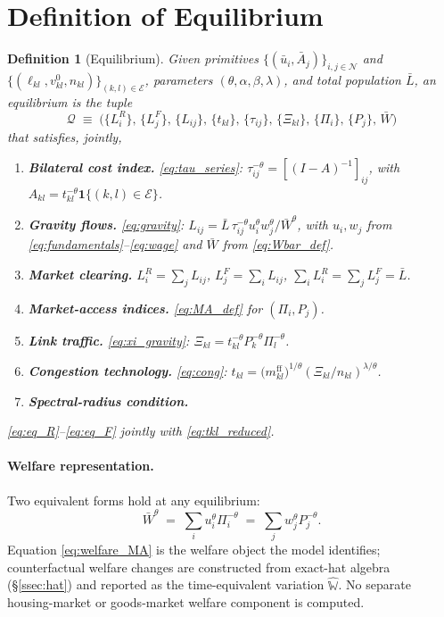 \documentclass[12pt]{article}
\newtheorem{definition}{Definition}
\newcommand{\N}{\mathcal N}
\newcommand{\E}{\mathcal E}
\newcommand{\Lbar}{\bar L}
\newcommand{\Wbar}{\bar W}
\newcommand{\ubar}{\bar u}
\newcommand{\Abar}{\bar A}
\newcommand{\tbar}{m^{\mathrm{ff}}}
\newcommand{\tkl}{t_{kl}}
\newcommand{\tijk}{\tau_{ij}}
\begin{document}
\section{Definition of Equilibrium}\label{sec:eq}

\begin{definition}[Equilibrium]\label{def:eq}
Given primitives $\{(\ubar_i,\Abar_j)\}_{i,j\in\N}$ and
$\{(\ell_{kl},v^{0}_{kl},n_{kl})\}_{(k,l)\in\E}$, parameters
$(\theta,\alpha,\beta,\lambda)$, and total population $\Lbar$, an
equilibrium is the tuple
\[
  \mathcal Q
  \;\equiv\;
  \bigl(
    \{L_i^R\},\,\{L_j^F\},\,\{L_{ij}\},\,
    \{\tkl\},\,\{\tijk\},\,\{\Xi_{kl}\},\,
    \{\Pi_i\},\,\{P_j\},\,\Wbar
  \bigr)
\]
that satisfies, jointly,
\begin{enumerate}[label=(\textbf{E\arabic*}),leftmargin=3em,itemsep=0.25em]
\item \textbf{Bilateral cost index.} \eqref{eq:tau_series}:
  $\tijk^{-\theta}=[(I-A)^{-1}]_{ij}$, with
  $A_{kl}=\tkl^{-\theta}\mathbf 1\{(k,l)\in\E\}$.
\item \textbf{Gravity flows.} \eqref{eq:gravity}:
  $L_{ij}=\Lbar\,\tijk^{-\theta}u_i^{\theta}w_j^{\theta}/\Wbar^{\theta}$,
  with $u_i,w_j$ from \eqref{eq:fundamentals}--\eqref{eq:wage} and
  $\Wbar$ from \eqref{eq:Wbar_def}.
\item \textbf{Market clearing.} $L_i^R=\sum_j L_{ij}$,
  $L_j^F=\sum_i L_{ij}$, $\sum_i L_i^R=\sum_j L_j^F=\Lbar$.
\item \textbf{Market-access indices.} \eqref{eq:MA_def} for
  $(\Pi_i,P_j)$.
\item \textbf{Link traffic.} \eqref{eq:xi_gravity}:
  $\Xi_{kl}=\tkl^{-\theta}P_k^{-\theta}\Pi_l^{-\theta}$.
\item \textbf{Congestion technology.} \eqref{eq:cong}:
  $\tkl=\bigl(\tbar_{kl}\bigr)^{1/\theta}(\Xi_{kl}/n_{kl})^{\lambda/\theta}$.
\item \textbf{Spectral-radius condition.} 
\end{enumerate}
\eqref{eq:eq_R}--\eqref{eq:eq_F} jointly with
\eqref{eq:tkl_reduced}.
\end{definition}


\paragraph{Welfare representation.}
Two equivalent forms hold at any equilibrium:
\begin{equation}
  \Wbar^{\theta}
  \;=\;\sum_i u_i^{\theta}\Pi_i^{-\theta}
  \;=\;\sum_j w_j^{\theta}P_j^{-\theta}.
  \label{eq:welfare_MA}
\end{equation}
Equation \eqref{eq:welfare_MA} is the welfare object the model
identifies; counterfactual welfare changes are constructed from
exact-hat algebra (\S\ref{ssec:hat}) and reported as the time-equivalent
variation $\hat{\mathbb W}$.  No separate housing-market or goods-market
welfare component is computed.
\end{document}
